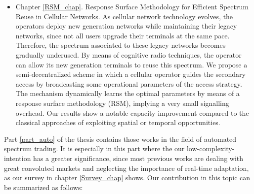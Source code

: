 \begin{itemize}
\item Chapter \ref{RSM_chap}. Response Surface Methodology for Efficient Spectrum Reuse in Cellular Networks.
As cellular network technology evolves, the operators deploy new generation networks while maintaining their legacy networks, since not all users upgrade their terminals at the same pace.
Therefore, the spectrum associated to these legacy networks becomes gradually underused.
By means of cognitive radio techniques, the operator can allow its new generation terminals to reuse this spectrum.
We propose a semi-decentralized scheme in which a cellular operator guides the secondary access by broadcasting some operational parameters of the access strategy.
The mechanism dynamically learns the optimal parameters by means of a response surface methodology (RSM), implying a very small signalling overhead.
Our results show a notable capacity improvement compared to the classical approaches of exploiting spatial or temporal opportunities.
\end{itemize}  
Part \ref{part_auto} of the thesis contains those works in the field of automated spectrum trading. 
It is especially in this part where the our low-complexity-intention has a greater significance, since most previous works are dealing with great convoluted markets and neglecting the importance of real-time adaptation, as our survey in chapter \ref{Survey_chap} shows. 
Our contribution in this topic can be summarized as follows:
